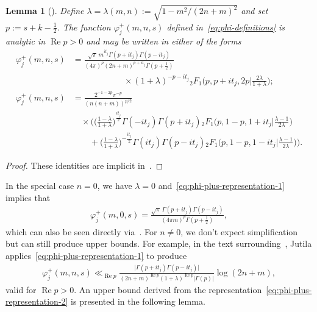 \documentclass[11pt,reqno]{amsart}
\theoremstyle{plain}
\newtheorem{lemma}[theorem]{Lemma}
\theoremstyle{definition}
\numberwithin{equation}{section}
\renewcommand{\Re}{\operatorname{Re}}
\begin{document}
\begin{lemma}[{\cite[\S{3}]{Jutila96}}] \label{lem:phi-plus-behavior}
Define $\lambda = \lambda(m,n) := \sqrt{1-m^2/(2n+m)^2}$ and set $p := s+k-\frac{1}{2}$. The function $\varphi_j^+(m,n,s)$ defined in~\eqref{eq:phi-definitions} is analytic in $\Re p > 0$ and may be written in either of the forms
\begin{align}
	\varphi_j^+(m,n,s) \label{eq:phi-plus-representation-1}
	&= \frac{\sqrt{\pi} \, m^{it_j} \Gamma(p+it_j)\Gamma(p-it_j)}
					{(4\pi)^p (2n+m)^{p+it_j} \Gamma(p+\frac{1}{2})} \\
	& \qquad \qquad \qquad
		\times (1+\lambda)^{-p-it_j} {}_2F_1\Big(p, p+it_j, 2p
						\Big\vert \tfrac{2\lambda}{1+\lambda} \Big); \\
	\varphi_j^+(m,n,s)  \label{eq:phi-plus-representation-2}
	&= \frac{2^{-1-2p} \pi^{-p}}
					{(n(n+m))^{p/2}}  \\
	& \quad  
		\times \Big( \Big(\frac{1-\lambda}{1+\lambda}\Big)^{\frac{it_j}{2}} \Gamma(-it_j)\Gamma(p+it_j)
					{}_2F_1\Big(p, 1-p, 1+it_j
						\Big\vert \tfrac{\lambda-1}{2\lambda} \Big) \\
		& \qquad  
				+ \Big(\frac{1-\lambda}{1+\lambda}\Big)^{-\frac{it_j}{2}} \Gamma(it_j)\Gamma(p-it_j)
					{}_2F_1\Big(p, 1-p, 1-it_j
						\Big\vert \tfrac{\lambda-1}{2\lambda} \Big)\Big).
\end{align}
\end{lemma}

\begin{proof} These identities are implicit in~\cite[(3.16)-(3.21)]{Jutila96}.
\end{proof}

In the special case $n=0$, we have $\lambda = 0$ and~\eqref{eq:phi-plus-representation-1} implies that
\begin{align} \label{eq:phi-plus-closed-form}
	\varphi_j^+(m,0,s)
		= \frac{\sqrt{\pi} \, \Gamma(p+it_j)\Gamma(p-it_j)}
					{(4\pi m )^p  \Gamma(p+\frac{1}{2})},
\end{align}
which can also be seen directly via~\cite[6.621(3)]{GradshteynRyzhik07}. For $n \neq 0$, we don't expect simplification but can still produce upper bounds. For example, in the text surrounding~\cite[(4.5)]{Jutila97}, Jutila applies~\eqref{eq:phi-plus-representation-1} to produce 
\begin{align} \label{eq:phi-plus-upper-bound-1}
	\varphi_j^+(m,n,s)
		\ll_{\Re p} \frac{\vert \Gamma(p+it_j)\Gamma(p-it_j) \vert}
					{(2n+m)^{\Re p} (1+\lambda)^{\Re p} \vert \Gamma(p) \vert}
				\log(2n+m),
\end{align}
valid for $\Re p > 0$. An upper bound derived from the representation~\eqref{eq:phi-plus-representation-2} is presented in the following lemma.
\end{document}
